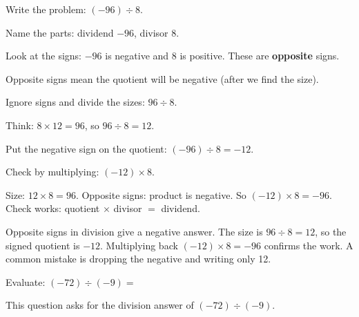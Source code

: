 \begin{steps}
  \item Write the problem: $(-96) \div 8$.
  \item Name the parts: dividend $-96$, divisor 8.
  \item Look at the signs: $-96$ is negative and 8 is positive. These are \textbf{opposite} signs.
  \item Opposite signs mean the quotient will be negative (after we find the size).
  \item Ignore signs and divide the sizes: $96 \div 8$.
  \item Think: $8 \times 12 = 96$, so $96 \div 8 = 12$.
  \item Put the negative sign on the quotient: $(-96) \div 8 = -12$.
  \item Check by multiplying: $(-12) \times 8$.
  \item Size: $12 \times 8 = 96$. Opposite signs: product is negative. So $(-12) \times 8 = -96$. Check works: quotient $\times$ divisor $=$ dividend.
\end{steps}


\noindent Opposite signs in division give a negative answer. The size is $96 \div 8 = 12$, so the signed quotient is $-12$. Multiplying back $(-12) \times 8 = -96$ confirms the work. A common mistake is dropping the negative and writing only 12.


\noindent Evaluate: $(-72) \div (-9) =$


\noindent This question asks for the division answer of $(-72) \div (-9)$.

